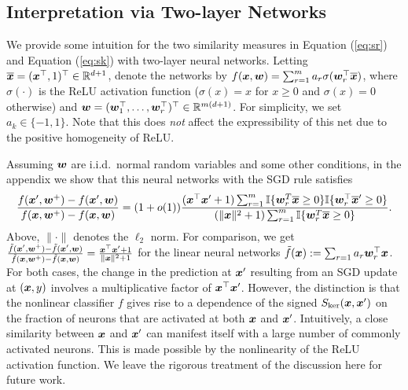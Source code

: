 \subsection{Interpretation via Two-layer Networks}
\label{sec:interpr-two-layer}

We provide some intuition for the two similarity measures in Equation (\ref{eq:sr}) and Equation (\ref{eq:sk}) with two-layer neural networks. Letting $\overline{\bm{x}} = (\bm{x}^\top, 1)^\top \in \mathbb{R}^{d+1}$, denote the networks by $f(\bm{x}, \bm{w}) = \sum_{r=1}^m a_r \sigma(\bm{w}_r^\top \overline{\bm{x}})$, where $\sigma(\cdot)$ is the ReLU activation function ($\sigma(x) = x$ for $x \ge 0$ and $\sigma(x) = 0$ otherwise) and $\bm{w} = (\bm{w}_1^\top, \ldots, \bm{w}_r^\top)^\top \in \mathbb{R}^{m(d+1)}$. For simplicity, we set $a_k \in \{-1, 1\}$. Note that this does \textit{not} affect the expressibility of this net due to the positive homogeneity of ReLU.

Assuming $\bm{w}$ are i.i.d.~normal random variables and some other conditions, in the appendix we show that this neural networks with the SGD rule satisfies
\begin{equation}\label{eq:dnn_diff}
\frac{f(\bm{x}', \bm{w}^+) - f(\bm{x}', \bm{w})}{f(\bm{x}, \bm{w}^+) - f(\bm{x}, \bm{w})} = (1 + o(1)) \frac{(\bm{x}^\top \bm{x}' + 1) \sum_{r=1}^m \mathbb{I}\{\bm{w}_r^T \overline{\bm{x}} \ge 0\} \mathbb{I}\{\bm{w}_r^\top \overline{\bm{x}}' \ge 0\}}{(\|\bm{x}\|^2 +1) \sum_{r=1}^m \mathbb{I}\{\bm{w}_r^T \overline{\bm{x}} \ge 0\}}.
\end{equation}
Above, $\|\cdot\|$ denotes the $\ell_2$ norm. For comparison, we get $\frac{\tilde f(\bm{x}', \bm{w}^+) - \tilde f(\bm{x}', \bm{w})}{\tilde f(\bm{x}, \bm{w}^+) - \tilde f(\bm{x}, \bm{w})} = \frac{\bm{x}^\top \bm{x}' + 1}{\|\bm{x}\|^2 + 1}$ for the linear neural networks $\tilde f(\bm{x}) := \sum_{r=1} a_r \bm{w}_r^\top \bm{x}$. For both cases, the change in the prediction at $\bm{x}'$ resulting from an SGD update at $(\bm{x}, y)$ involves a multiplicative factor of $\bm{x}^\top \bm{x}'$. However, the distinction is that the nonlinear classifier $f$ gives rise to a dependence of the signed $S_{\mathrm{ker}}(\bm{x}, \bm{x}')$ on the fraction of neurons that are activated at both $\bm{x}$ and $\bm{x}'$. Intuitively, a close similarity between $\bm{x}$ and $\bm{x}'$ can manifest itself with a large number of commonly activated neurons. This is made possible by the nonlinearity of the ReLU activation function. We leave the rigorous treatment of the discussion here for future work.


